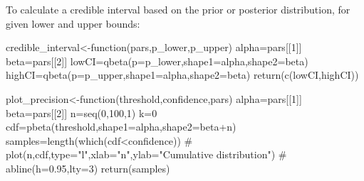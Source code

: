 




  To calculate a credible interval based on the prior or posterior distribution, for given lower and upper bounds:

  \vspace{12pt}
  
credible_interval<-function(pars,p_lower,p_upper){
  alpha=pars[[1]]
  beta=pars[[2]]
  lowCI=qbeta(p=p_lower,shape1=alpha,shape2=beta)
  highCI=qbeta(p=p_upper,shape1=alpha,shape2=beta)
  return(c(lowCI,highCI))
}

plot_precision<-function(threshold,confidence,pars){
  alpha=pars[[1]]
  beta=pars[[2]]
  n=seq(0,100,1)
  k=0
  cdf=pbeta(threshold,shape1=alpha,shape2=beta+n)
  samples=length(which(cdf<confidence))
  # plot(n,cdf,type="l",xlab="n",ylab="Cumulative distribution")
  # abline(h=0.95,lty=3)
  return(samples)
}


